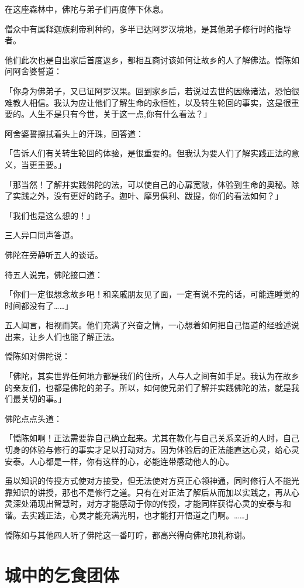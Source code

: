 \documentclass[twoside,openany]{book}
\begin{document}
在这座森林中，佛陀与弟子们再度停下休息。

僧众中有属释迦族刹帝利种的，多半已达阿罗汉境地，是其他弟子修行时的指导者。

他们此次也是自出家后首度返乡，都相互商讨该如何让故乡的人了解佛法。憍陈如问阿舍婆誓道：

「你身为佛弟子，又已证阿罗汉果。回到家乡后，若说过去世的因缘诸法，恐怕很难教人相信。我认为应让他们了解生命的永恒性，以及转生轮回的事实，这是很重要的。人生不是只有今世，关于这一点,你有什么看法？」

阿舍婆誓擦拭着头上的汗珠，回答道：

「告诉人们有关转生轮回的体验，是很重要的。但我认为要人们了解实践正法的意义，当更重要。」

「那当然！了解并实践佛陀的法，可以使自己的心扉宽敞，体验到生命的奥秘。除了实践之外，没有更好的路子。迦叶、摩男俱利、跋提，你们的看法如何？」 

「我们也是这么想的！」

三人异口同声答道。

佛陀在旁静听五人的谈话。

待五人说完，佛陀接口道：

「你们一定很想念故乡吧！和亲戚朋友见了面，一定有说不完的话，可能连睡觉的时间都没有了……」

五人闻言，相视而笑。他们充满了兴奋之情，一心想着如何把自己悟道的经验述说出来，让乡人们也能了解正法。

憍陈如对佛陀说：

「佛陀，其实世界任何地方都是我们的住所，人与人之间有如手足。我认为在故乡的亲友们，也都是佛陀的弟子。所以，如何使兄弟们了解并实践佛陀的法，就是我们最关切的事。」

佛陀点点头道：

「憍陈如啊！正法需要靠自己确立起来。尤其在教化与自己关系亲近的人时，自己切身的体验与修行的事实才足以打动对方。因为体验后的正法能直达心灵，给心灵安泰。人心都是一样，你有这样的心，必能连带感动他人的心。

虽以知识的传授方式使对方接受，但无法使对方真正心领神通，同时修行人不能光靠知识的讲授，那也不是修行之道。只有在对正法了解后从而加以实践之，再从心灵深处涌现出智慧时，对方才能感动于你的传授，才能同样获得心灵的安泰与和谐。去实践正法，心灵才能充满光明，也才能打开悟道之门啊。……」

憍陈如与其他四人听了佛陀这一番叮咛，都高兴得向佛陀顶礼称谢。

\section{城中的乞食团体}\label{sec8.2}
\end{document}
